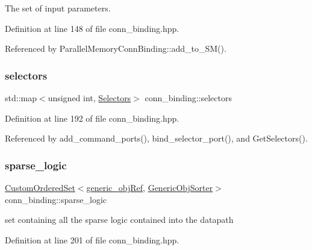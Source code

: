 The set of input parameters. 



Definition at line 148 of file conn\+\_\+binding.\+hpp.



Referenced by Parallel\+Memory\+Conn\+Binding\+::add\+\_\+to\+\_\+\+S\+M().

\mbox{\label{classconn__binding_afeb17985cbcc1739c90e5428700aecfb}} 
\subsubsection{\texorpdfstring{selectors}{selectors}}
{\footnotesize\ttfamily std\+::map$<$unsigned int, \hyperlink{classconn__binding_a1994d72baf506bcb1d94e0cfede4258b}{Selectors}$>$ conn\+\_\+binding\+::selectors\hspace{0.3cm}{\ttfamily [protected]}}



Definition at line 192 of file conn\+\_\+binding.\+hpp.



Referenced by add\+\_\+command\+\_\+ports(), bind\+\_\+selector\+\_\+port(), and Get\+Selectors().

\mbox{\label{classconn__binding_a6f2b90952b7cb790fe4fabe7399ea90c}} 
\subsubsection{\texorpdfstring{sparse\+\_\+logic}{sparse\_logic}}
{\footnotesize\ttfamily \hyperlink{classCustomOrderedSet}{Custom\+Ordered\+Set}$<$\hyperlink{generic__obj_8hpp_acb533b2ef8e0fe72e09a04d20904ca81}{generic\+\_\+obj\+Ref}, \hyperlink{classGenericObjSorter}{Generic\+Obj\+Sorter}$>$ conn\+\_\+binding\+::sparse\+\_\+logic\hspace{0.3cm}{\ttfamily [protected]}}



set containing all the sparse logic contained into the datapath 



Definition at line 201 of file conn\+\_\+binding.\+hpp.



